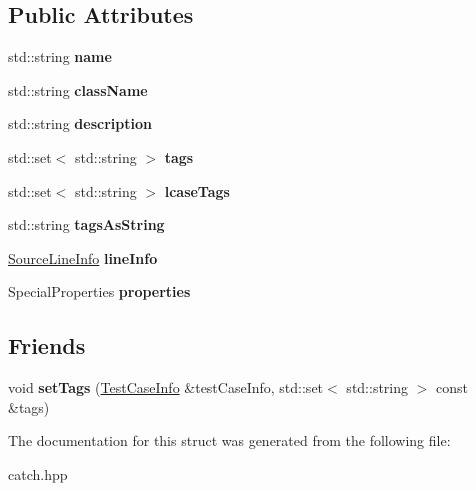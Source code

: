 \subsection*{Public Attributes}
\begin{DoxyCompactItemize}
\item 
std\+::string {\bfseries name}\hypertarget{structCatch_1_1TestCaseInfo_a463794e2f5cfead307c93efd134ade36}{}\label{structCatch_1_1TestCaseInfo_a463794e2f5cfead307c93efd134ade36}

\item 
std\+::string {\bfseries class\+Name}\hypertarget{structCatch_1_1TestCaseInfo_a1a5e0825132a38d091defdebbf2f8ce9}{}\label{structCatch_1_1TestCaseInfo_a1a5e0825132a38d091defdebbf2f8ce9}

\item 
std\+::string {\bfseries description}\hypertarget{structCatch_1_1TestCaseInfo_a37fe2db9425bc45f6a33893eac31198e}{}\label{structCatch_1_1TestCaseInfo_a37fe2db9425bc45f6a33893eac31198e}

\item 
std\+::set$<$ std\+::string $>$ {\bfseries tags}\hypertarget{structCatch_1_1TestCaseInfo_a045f62e7719a8760a5b456f7fd2dc97c}{}\label{structCatch_1_1TestCaseInfo_a045f62e7719a8760a5b456f7fd2dc97c}

\item 
std\+::set$<$ std\+::string $>$ {\bfseries lcase\+Tags}\hypertarget{structCatch_1_1TestCaseInfo_a0ed3864a313e8ddc3ae38431be5be9ae}{}\label{structCatch_1_1TestCaseInfo_a0ed3864a313e8ddc3ae38431be5be9ae}

\item 
std\+::string {\bfseries tags\+As\+String}\hypertarget{structCatch_1_1TestCaseInfo_ac65c2d36fd36f71e9bf782b2ea245c64}{}\label{structCatch_1_1TestCaseInfo_ac65c2d36fd36f71e9bf782b2ea245c64}

\item 
\hyperlink{structCatch_1_1SourceLineInfo}{Source\+Line\+Info} {\bfseries line\+Info}\hypertarget{structCatch_1_1TestCaseInfo_aa9407b7f442655b51a2aad24b3fa2fd3}{}\label{structCatch_1_1TestCaseInfo_aa9407b7f442655b51a2aad24b3fa2fd3}

\item 
Special\+Properties {\bfseries properties}\hypertarget{structCatch_1_1TestCaseInfo_afc1e84bd7a2e180895a06d9131302af0}{}\label{structCatch_1_1TestCaseInfo_afc1e84bd7a2e180895a06d9131302af0}

\end{DoxyCompactItemize}
\subsection*{Friends}
\begin{DoxyCompactItemize}
\item 
void {\bfseries set\+Tags} (\hyperlink{structCatch_1_1TestCaseInfo}{Test\+Case\+Info} \&test\+Case\+Info, std\+::set$<$ std\+::string $>$ const \&tags)\hypertarget{structCatch_1_1TestCaseInfo_addc10c770e56f49da5baa0c76cf25bd5}{}\label{structCatch_1_1TestCaseInfo_addc10c770e56f49da5baa0c76cf25bd5}

\end{DoxyCompactItemize}


The documentation for this struct was generated from the following file\+:\begin{DoxyCompactItemize}
\item 
catch.\+hpp\end{DoxyCompactItemize}
